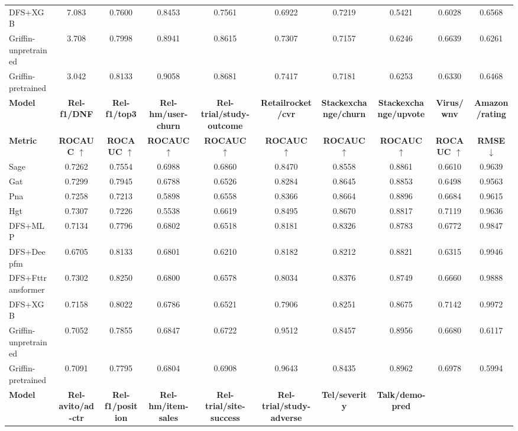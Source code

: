 \documentclass{article}
\theoremstyle{plain}
\theoremstyle{definition}
\theoremstyle{remark}
\begin{document}
\begin{table}[h]
{\begin{tabular}{lccccccccc}
        DFS+XGB & 7.083 & 0.7600 & 0.8453 & 0.7561 & 0.6922 & 0.7219 & 0.5421 & 0.6028 & 0.6568 \\
        Griffin-unpretrained & 3.708 & 0.7998 & 0.8941 & 0.8615 & 0.7307 & 0.7157 & 0.6246 & 0.6639 & 0.6261 \\
        Griffin-pretrained & 3.042 & 0.8133 & 0.9058 & 0.8681 & 0.7417 & 0.7181 & 0.6253 & 0.6330 & 0.6468 \\
        \midrule
        \textbf{Model} & \textbf{Rel-f1/DNF} & \textbf{Rel-f1/top3} & \textbf{Rel-hm/user-churn} & \textbf{Rel-trial/study-outcome} & \textbf{Retailrocket/cvr} & \textbf{Stackexchange/churn} & \textbf{Stackexchange/upvote} & \textbf{Virus/wnv} & \textbf{Amazon/rating} \\
        \textbf{Metric} & \textbf{ROCAUC $\uparrow$} & \textbf{ROCAUC $\uparrow$} & \textbf{ROCAUC $\uparrow$} & \textbf{ROCAUC $\uparrow$} & \textbf{ROCAUC $\uparrow$} & \textbf{ROCAUC $\uparrow$} & \textbf{ROCAUC $\uparrow$} & \textbf{ROCAUC $\uparrow$} & \textbf{RMSE $\downarrow$} \\
        \midrule
        Sage & 0.7262 & 0.7554 & 0.6988 & 0.6860 & 0.8470 & 0.8558 & 0.8861 & 0.6610 & 0.9639 \\
        Gat & 0.7299 & 0.7945 & 0.6788 & 0.6526 & 0.8284 & 0.8645 & 0.8853 & 0.6498 & 0.9563 \\
        Pna & 0.7258 & 0.7213 & 0.5898 & 0.6558 & 0.8366 & 0.8664 & 0.8896 & 0.6684 & 0.9615 \\
        Hgt & 0.7307 & 0.7226 & 0.5538 & 0.6619 & 0.8495 & 0.8670 & 0.8817 & 0.7119 & 0.9636 \\
        DFS+MLP & 0.7134 & 0.7796 & 0.6802 & 0.6518 & 0.8181 & 0.8326 & 0.8783 & 0.6772 & 0.9847 \\
        DFS+Deepfm & 0.6705 & 0.8133 & 0.6801 & 0.6210 & 0.8182 & 0.8212 & 0.8821 & 0.6315 & 0.9946 \\
        DFS+Fttransformer & 0.7302 & 0.8250 & 0.6800 & 0.6578 & 0.8034 & 0.8376 & 0.8749 & 0.6660 & 0.9888 \\
        DFS+XGB & 0.7158 & 0.8022 & 0.6786 & 0.6521 & 0.7906 & 0.8251 & 0.8675 & 0.7142 & 0.9972 \\
        Griffin-unpretrained & 0.7052 & 0.7855 & 0.6847 & 0.6722 & 0.9512 & 0.8457 & 0.8956 & 0.6680 & 0.6117 \\
        Griffin-pretrained & 0.7091 & 0.7795 & 0.6804 & 0.6908 & 0.9643 & 0.8435 & 0.8962 & 0.6978 & 0.5994 \\
        \midrule
        \textbf{Model} & \textbf{Rel-avito/ad-ctr} & \textbf{Rel-f1/position} & \textbf{Rel-hm/item-sales} & \textbf{Rel-trial/site-success} & \textbf{Rel-trial/study-adverse} & \textbf{Tel/severity} & \textbf{Talk/demo-pred} \\

\end{tabular}}
\end{table}
\end{document}
